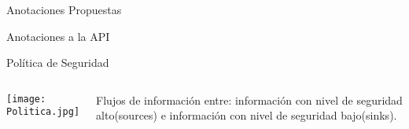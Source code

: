 \begin{frame}{Anotaciones Propuestas}
	
\end{frame}
\begin{frame}{Anotaciones a la API}
	
\end{frame}
















\begin{frame}{Política de Seguridad}
	\begin{columns}[c]
	\column{1.5in}
	\begin{center}
	\texttt{[image: Politica.jpg]} 
	\end{center}
	\column{1.5in}
	Flujos de información entre: información con nivel de seguridad alto(sources) e
	información con nivel de seguridad bajo(sinks).
	\end{columns}
\end{frame}

